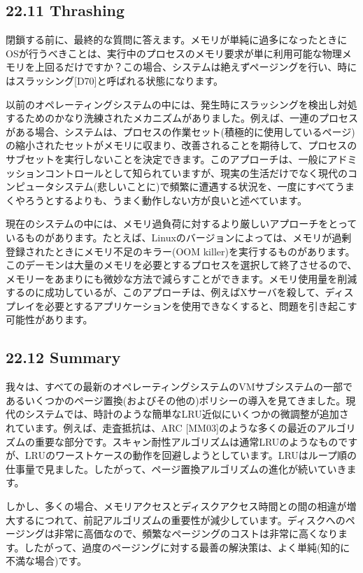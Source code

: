 \hypertarget{thrashing}{%
\subsection*{22.11 Thrashing}\label{thrashing}}

閉鎖する前に、最終的な質問に答えます。メモリが単純に過多になったときにOSが行うべきことは、実行中のプロセスのメモリ要求が単に利用可能な物理メモリを上回るだけですか？この場合、システムは絶えずページングを行い、時にはスラッシング{[}D70{]}と呼ばれる状態になります。

以前のオペレーティングシステムの中には、発生時にスラッシングを検出し対処するためのかなり洗練されたメカニズムがありました。例えば、一連のプロセスがある場合、システムは、プロセスの作業セット(積極的に使用しているページ)の縮小されたセットがメモリに収まり、改善されることを期待して、プロセスのサブセットを実行しないことを決定できます。このアプローチは、一般にアドミッションコントロールとして知られていますが、現実の生活だけでなく現代のコンピュータシステム(悲しいことに)で頻繁に遭遇する状況を、一度にすべてうまくやろうとするよりも、うまく動作しない方が良いと述べています。

現在のシステムの中には、メモリ過負荷に対するより厳しいアプローチをとっているものがあります。たとえば、Linuxのバージョンによっては、メモリが過剰登録されたときにメモリ不足のキラー(OOM
killer)を実行するものがあります。このデーモンは大量のメモリを必要とするプロセスを選択して終了させるので、メモリーをあまりにも微妙な方法で減らすことができます。メモリ使用量を削減するのに成功しているが、このアプローチは、例えばXサーバを殺して、ディスプレイを必要とするアプリケーションを使用できなくすると、問題を引き起こす可能性があります。

\hypertarget{summary-14}{%
\subsection*{22.12 Summary}\label{summary-14}}

我々は、すべての最新のオペレーティングシステムのVMサブシステムの一部であるいくつかのページ置換(およびその他の)ポリシーの導入を見てきました。現代のシステムでは、時計のような簡単なLRU近似にいくつかの微調整が追加されています。例えば、走査抵抗は、ARC
{[}MM03{]}のような多くの最近のアルゴリズムの重要な部分です。スキャン耐性アルゴリズムは通常LRUのようなものですが、LRUのワーストケースの動作を回避しようとしています。LRUはループ順の仕事量で見ました。したがって、ページ置換アルゴリズムの進化が続いていきます。

しかし、多くの場合、メモリアクセスとディスクアクセス時間との間の相違が増大するにつれて、前記アルゴリズムの重要性が減少しています。ディスクへのページングは非常に高価なので、頻繁なページングのコストは非常に高くなります。したがって、過度のページングに対する最善の解決策は、よく単純(知的に不満な場合)です。

